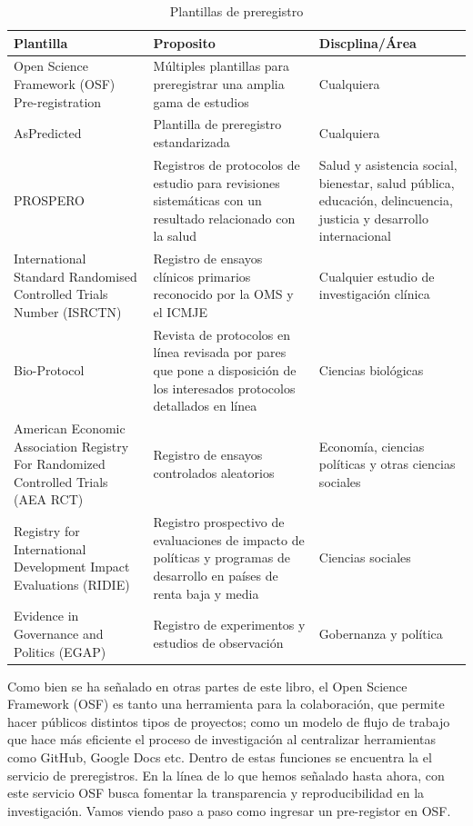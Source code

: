 \documentclass[
]{book}
\begin{document}
\begin{table}[!h]

\caption{\label{tab:tabprereg}Plantillas de preregistro}
\centering
\fontsize{10}{12}\selectfont
\begin{tabu} to 
\toprule
Plantilla & Proposito & Discplina/Área\\
\midrule
Open Science Framework (OSF) Pre-registration & Múltiples plantillas para preregistrar una amplia gama de estudios & Cualquiera\\
AsPredicted & Plantilla de preregistro estandarizada & Cualquiera\\
PROSPERO & Registros de protocolos de estudio para revisiones sistemáticas con un resultado relacionado con la salud & Salud y asistencia social, bienestar, salud pública, educación, delincuencia, justicia y desarrollo internacional\\
International Standard Randomised Controlled Trials Number (ISRCTN) & Registro de ensayos clínicos primarios reconocido por la OMS y el ICMJE & Cualquier estudio de investigación clínica\\
Bio-Protocol & Revista de protocolos en línea revisada por pares que pone a disposición de los interesados protocolos detallados en línea & Ciencias biológicas\\
American Economic Association Registry For Randomized Controlled Trials (AEA RCT) & Registro de ensayos controlados aleatorios & Economía, ciencias políticas y otras ciencias sociales\\
Registry for International Development Impact Evaluations (RIDIE) & Registro prospectivo de evaluaciones de impacto de políticas y programas de desarrollo en países de renta baja y media & Ciencias sociales\\
Evidence in Governance and Politics (EGAP) & Registro de experimentos y estudios de observación & Gobernanza y política\\
\bottomrule
\end{tabu}
\end{table}

Como bien se ha señalado en otras partes de este libro, el Open Science Framework (OSF) es tanto una herramienta para la colaboración, que permite hacer públicos distintos tipos de proyectos; como un modelo de flujo de trabajo que hace más eficiente el proceso de investigación al centralizar herramientas como GitHub, Google Docs etc. Dentro de estas funciones se encuentra la el servicio de preregistros. En la línea de lo que hemos señalado hasta ahora, con este servicio OSF busca fomentar la transparencia y reproducibilidad en la investigación. Vamos viendo paso a paso como ingresar un pre-registor en OSF.
\end{document}
